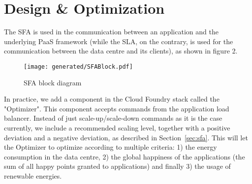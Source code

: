 \section{Design \& Optimization}
\label{sec:implem}

The SFA is used in the communication between an application and the underlying PaaS framework (while the SLA, on the contrary, is used for the communication between the data centre and its clients), as shown in figure 2.

\begin{figure}[h]
\label{fig:SFABlock}
\centering
\texttt{[image: generated/SFABlock.pdf]}
\caption{SFA block diagram}
\end{figure}

In practice, we add a component in the Cloud Foundry stack called the "Optimizer".
This component accepts commands from the application load balancer.
Instead of just scale-up/scale-down commands as it is the case currently, we include a recommended scaling level, together with a positive deviation and a negative deviation, as described in Section~\ref{sec:sfa}.
This will let the Optimizer to optimize according to multiple criteria: 1) the energy consumption in the data centre, 2) the global happiness of the applications (the sum of all happy points granted to applications) and finally 3) the usage of renewable energies.
